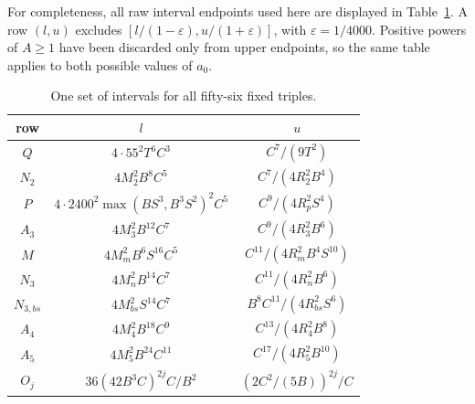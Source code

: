 \documentclass[12pt]{article}
\numberwithin{equation}{section}
\begin{document}
For completeness, all raw interval endpoints used here are displayed
in Table~\ref{tab:fixed56-windows}. A row $(l,u)$ excludes
$[l/(1-\varepsilon),u/(1+\varepsilon)]$, with
$\varepsilon=1/4000$. Positive powers of $A\ge1$ have been discarded
only from upper endpoints, so the same table applies to both possible
values of $a_0$.
\begin{table}[ht]\centering\small
\begin{tabular}{c|c|c}
row&$l$&$u$\\\hline
$Q$&$4\cdot55^2T^6C^3$&$C^7/(9T^2)$\\
$N_2$&$4M_2^2B^8C^5$&$C^7/(4R_2^2B^4)$\\
$P$&$4\cdot2400^2\max(BS^3,B^3S^2)^2C^5$&$C^9/(4R_p^2S^4)$\\
$A_3$&$4M_3^2B^{12}C^7$&$C^9/(4R_3^2B^6)$\\
$M$&$4M_m^2B^6S^{16}C^5$&$C^{11}/(4R_m^2B^4S^{10})$\\
$N_3$&$4M_n^2B^{14}C^7$&$C^{11}/(4R_n^2B^6)$\\
$N_{3,bs}$&$4M_{bs}^2S^{14}C^7$&$B^8C^{11}/(4R_{bs}^2S^6)$\\
$A_4$&$4M_4^2B^{18}C^9$&$C^{13}/(4R_4^2B^8)$\\
$A_5$&$4M_5^2B^{24}C^{11}$&$C^{17}/(4R_5^2B^{10})$\\
$O_j$&$36(42B^3C)^{2j}C/B^2$&$(2C^2/(5B))^{2j}/C$
\end{tabular}
\caption{One set of intervals for all fifty-six fixed triples.}
\label{tab:fixed56-windows}
\end{table}
\end{document}
